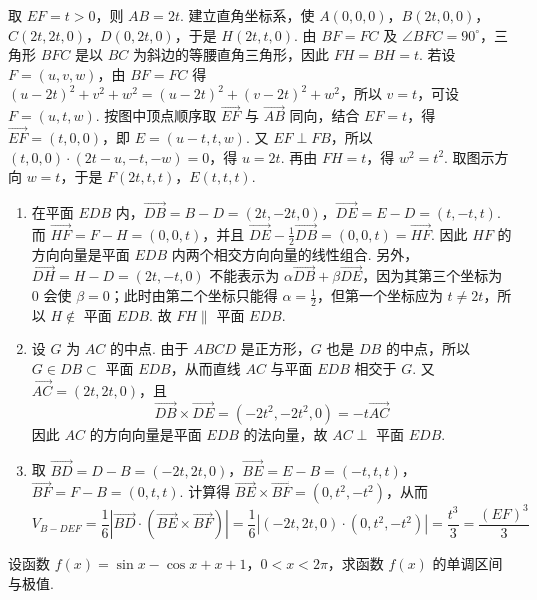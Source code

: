\begin{solution}
取 \(EF=t>0\)，则 \(AB=2t\). 建立直角坐标系，使
\(A(0,0,0)\)，\(B(2t,0,0)\)，\(C(2t,2t,0)\)，\(D(0,2t,0)\)，于是 \(H(2t,t,0)\). 由 \(BF=FC\) 及 \(\angle BFC=90^\circ\)，三角形 \(BFC\) 是以 \(BC\) 为斜边的等腰直角三角形，因此 \(FH=BH=t\). 若设 \(F=(u,v,w)\)，由 \(BF=FC\) 得 \((u-2t)^2+v^2+w^2=(u-2t)^2+(v-2t)^2+w^2\)，所以 \(v=t\)，可设 \(F=(u,t,w)\). 按图中顶点顺序取 \(\overrightarrow{EF}\) 与 \(\overrightarrow{AB}\) 同向，结合 \(EF=t\)，得 \(\overrightarrow{EF}=(t,0,0)\)，即 \(E=(u-t,t,w)\). 又 \(EF\perp FB\)，所以 \((t,0,0)\cdot(2t-u,-t,-w)=0\)，得 \(u=2t\). 再由 \(FH=t\)，得 \(w^2=t^2\). 取图示方向 \(w=t\)，于是 \(F(2t,t,t)\)，\(E(t,t,t)\).

\begin{enumerate}
\item 在平面 \(EDB\) 内，\(\overrightarrow{DB}=B-D=(2t,-2t,0)\)，\(\overrightarrow{DE}=E-D=(t,-t,t)\). 而 \(\overrightarrow{HF}=F-H=(0,0,t)\)，并且 \(\overrightarrow{DE}-\frac12\overrightarrow{DB}=(0,0,t)=\overrightarrow{HF}\). 因此 \(HF\) 的方向向量是平面 \(EDB\) 内两个相交方向向量的线性组合. 另外，\(\overrightarrow{DH}=H-D=(2t,-t,0)\) 不能表示为 \(\alpha\overrightarrow{DB}+\beta\overrightarrow{DE}\)，因为其第三个坐标为 \(0\) 会使 \(\beta=0\)；此时由第二个坐标只能得 \(\alpha=\frac12\)，但第一个坐标应为 \(t\ne2t\)，所以 \(H\notin\) 平面 \(EDB\). 故 \(FH\parallel\) 平面 \(EDB\).
\item 设 \(G\) 为 \(AC\) 的中点. 由于 \(ABCD\) 是正方形，\(G\) 也是 \(DB\) 的中点，所以 \(G\in DB\subset\) 平面 \(EDB\)，从而直线 \(AC\) 与平面 \(EDB\) 相交于 \(G\). 又 \(\overrightarrow{AC}=(2t,2t,0)\)，且
\[
\overrightarrow{DB}\times\overrightarrow{DE}=(-2t^2,-2t^2,0)=-t\overrightarrow{AC}
\]
因此 \(AC\) 的方向向量是平面 \(EDB\) 的法向量，故 \(AC\perp\) 平面 \(EDB\).
\item 取 \(\overrightarrow{BD}=D-B=(-2t,2t,0)\)，\(\overrightarrow{BE}=E-B=(-t,t,t)\)，\(\overrightarrow{BF}=F-B=(0,t,t)\). 计算得 \(\overrightarrow{BE}\times\overrightarrow{BF}=(0,t^2,-t^2)\)，从而
\[
V_{B-DEF}=\frac16\left|\overrightarrow{BD}\cdot\left(\overrightarrow{BE}\times\overrightarrow{BF}\right)\right|=\frac16\left|(-2t,2t,0)\cdot(0,t^2,-t^2)\right|=\frac{t^3}{3}=\frac{(EF)^3}{3}
\]
\end{enumerate}
\end{solution}

\begin{problem}
设函数 \(f(x) = \sin x - \cos x + x + 1\)，\(0 < x < 2\pi\)，求函数 \( f(x) \) 的单调区间与极值.
\end{problem}

